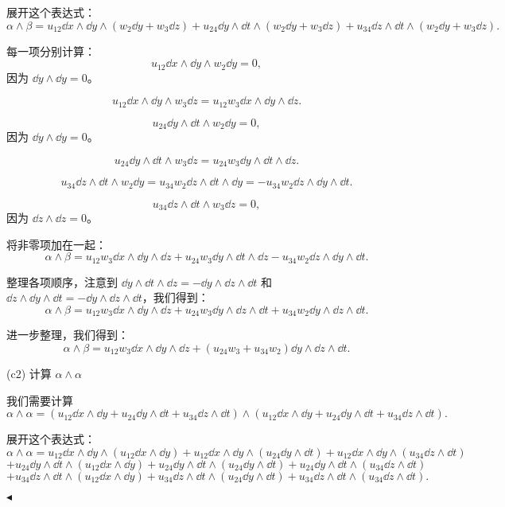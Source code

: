 \documentclass[11pt]{article}
\newenvironment{question}[2][Question]{\begin{trivlist}
\item[\hskip \labelsep {\bfseries #1}\hskip \labelsep {\bfseries #2.}]}{\hfill$\blacktriangleleft$\end{trivlist}}
\begin{document}
\begin{question}{3 (15') (外积)}
    展开这个表达式：
    \[
    \alpha \wedge \beta = u_{12} \dd{x} \wedge \dd{y} \wedge (w_2 \dd{y} + w_3 \dd{z}) + u_{24} \dd{y} \wedge \dd{t} \wedge (w_2 \dd{y} + w_3 \dd{z}) + u_{34} \dd{z} \wedge \dd{t} \wedge (w_2 \dd{y} + w_3 \dd{z}).
    \]
    
    每一项分别计算：
    \[
    u_{12} \dd{x} \wedge \dd{y} \wedge w_2 \dd{y} = 0,
    \]
    因为 \(\dd{y} \wedge \dd{y} = 0\)。
    
    \[
    u_{12} \dd{x} \wedge \dd{y} \wedge w_3 \dd{z} = u_{12} w_3 \dd{x} \wedge \dd{y} \wedge \dd{z}.
    \]
    
    \[
    u_{24} \dd{y} \wedge \dd{t} \wedge w_2 \dd{y} = 0,
    \]
    因为 \(\dd{y} \wedge \dd{y} = 0\)。
    
    \[
    u_{24} \dd{y} \wedge \dd{t} \wedge w_3 \dd{z} = u_{24} w_3 \dd{y} \wedge \dd{t} \wedge \dd{z}.
    \]
    
    \[
    u_{34} \dd{z} \wedge \dd{t} \wedge w_2 \dd{y} = u_{34} w_2 \dd{z} \wedge \dd{t} \wedge \dd{y} = -u_{34} w_2 \dd{z} \wedge \dd{y} \wedge \dd{t}.
    \]
    
    \[
    u_{34} \dd{z} \wedge \dd{t} \wedge w_3 \dd{z} = 0,
    \]
    因为 \(\dd{z} \wedge \dd{z} = 0\)。
    
    将非零项加在一起：
    \[
    \alpha \wedge \beta = u_{12} w_3 \dd{x} \wedge \dd{y} \wedge \dd{z} + u_{24} w_3 \dd{y} \wedge \dd{t} \wedge \dd{z} - u_{34} w_2 \dd{z} \wedge \dd{y} \wedge \dd{t}.
    \]
    
    整理各项顺序，注意到 \(\dd{y} \wedge \dd{t} \wedge \dd{z} = -\dd{y} \wedge \dd{z} \wedge \dd{t}\) 和 \(\dd{z} \wedge \dd{y} \wedge \dd{t} = -\dd{y} \wedge \dd{z} \wedge \dd{t}\)，我们得到：
    \[
    \alpha \wedge \beta = u_{12} w_3 \dd{x} \wedge \dd{y} \wedge \dd{z} + u_{24} w_3 \dd{y} \wedge \dd{z} \wedge \dd{t} + u_{34} w_2 \dd{y} \wedge \dd{z} \wedge \dd{t}.
    \]
    
    进一步整理，我们得到：
    \[
    \alpha \wedge \beta = u_{12} w_3 \dd{x} \wedge \dd{y} \wedge \dd{z} + (u_{24} w_3 + u_{34} w_2) \dd{y} \wedge \dd{z} \wedge \dd{t}.
    \]
    
     (c2) 计算 \(\alpha \wedge \alpha\)
    
    我们需要计算
    \[
    \alpha \wedge \alpha = \left( u_{12} \dd{x} \wedge \dd{y} + u_{24} \dd{y} \wedge \dd{t} + u_{34} \dd{z} \wedge \dd{t} \right) \wedge \left( u_{12} \dd{x} \wedge \dd{y} + u_{24} \dd{y} \wedge \dd{t} + u_{34} \dd{z} \wedge \dd{t} \right).
    \]
    
    展开这个表达式：
    \[
    \alpha \wedge \alpha = u_{12} \dd{x} \wedge \dd{y} \wedge (u_{12} \dd{x} \wedge \dd{y}) + u_{12} \dd{x} \wedge \dd{y} \wedge (u_{24} \dd{y} \wedge \dd{t}) + u_{12} \dd{x} \wedge \dd{y} \wedge (u_{34} \dd{z} \wedge \dd{t}) 
    \]
    \[
    + u_{24} \dd{y} \wedge \dd{t} \wedge (u_{12} \dd{x} \wedge \dd{y}) + u_{24} \dd{y} \wedge \dd{t} \wedge (u_{24} \dd{y} \wedge \dd{t}) + u_{24} \dd{y} \wedge \dd{t} \wedge (u_{34} \dd{z} \wedge \dd{t}) 
    \]
    \[
    + u_{34} \dd{z} \wedge \dd{t} \wedge (u_{12} \dd{x} \wedge \dd{y}) + u_{34} \dd{z} \wedge \dd{t} \wedge (u_{24} \dd{y} \wedge \dd{t}) + u_{34} \dd{z} \wedge \dd{t} \wedge (u_{34} \dd{z} \wedge \dd{t}).
    \]
    

\end{question}
\end{document}
